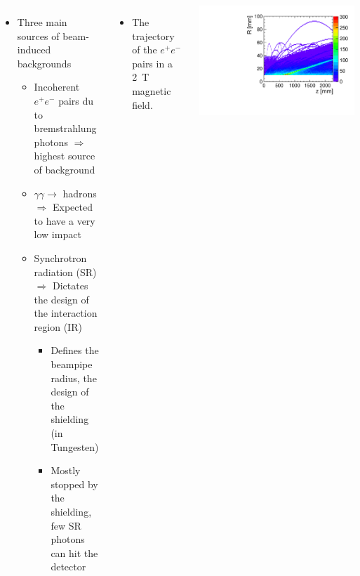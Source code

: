 \documentclass[final,xcolor={dvipsnames,svgnames,x11names,table}]{beamer}
\begin{document}
\begin{frame}
\begin{textblock}{80}
\begin{tcolorbox}[title=Main sources of beam-induced backgrounds at the FCC-ee and the impact on the IDEA drift chamber]
  \begin{columns}
    \begin{itemize}
      \item Three main sources of beam-induced backgrounds
      \begin{itemize}
        \item Incoherent $e^+e^-$ pairs du to bremstrahlung photons $\Rightarrow$ highest source of background
        \item $\gamma\gamma\rightarrow$ hadrons $\Rightarrow$ Expected to have a very low impact
        \item Synchrotron radiation (SR) $\Rightarrow$ Dictates the design of the interaction region (IR)
          \begin{itemize}
            \item Defines the beampipe radius, the design of the shielding (in Tungesten)
            \item Mostly stopped by the shielding, few SR photons can hit the detector
          \end{itemize}
      \end{itemize}
    \end{itemize}

    \begin{itemize}
      \item The trajectory of the $e^+e^−$ pairs in a 2~T magnetic field.
    \end{itemize}
    \centering
    \includegraphics[width=\textwidth]{../figures/pairs_R_Z}



\end{columns}
\end{tcolorbox}
\end{textblock}
\end{frame}
\end{document}

